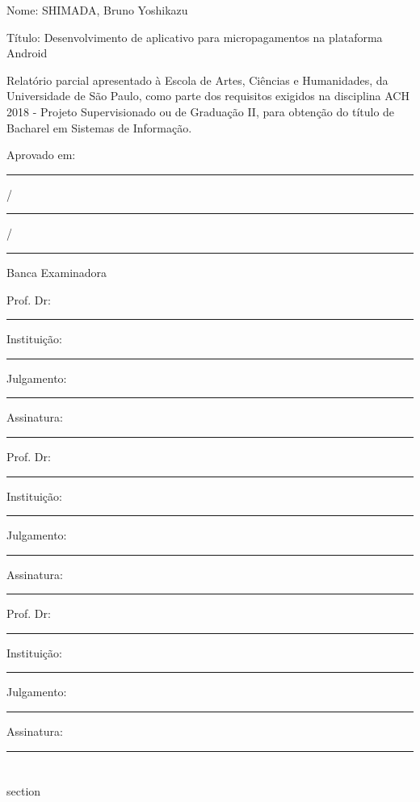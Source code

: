 \documentclass[hidelinks,12pt]{article}
\begin{document}
\begin{titlepage}
	\begin{flushleft}
		{\Large Nome: SHIMADA, Bruno Yoshikazu \par}
		{\Large T\'itulo: Desenvolvimento de aplicativo para micropagamentos na plataforma Android \par}
	\end{flushleft}
	\begin{flushright}
		Relat\'orio parcial apresentado \`a Escola de Artes, Ci\^encias e Humanidades, da Universidade de S\~ao Paulo, como parte dos requisitos exigidos na disciplina ACH 2018 - Projeto Supervisionado ou de Gradua\c{c}\~ao II, para obten\c{c}\~ao do t\'itulo de Bacharel em Sistemas de Informa\c{c}\~ao.
	\end{flushright}
	\vspace{1cm}
	\begin{flushleft}
		{\Large Aprovado em: \rule{1cm}{1pt}/\rule{1cm}{1pt}/\rule{2cm}{1pt} \par}
	\end{flushleft}
	\vfill
	\centering
		{\Large Banca Examinadora \par}
		\vspace{1cm}
		\begin{flushleft}
			{\Large Prof. Dr:\rule{5cm}{1pt}    Institui\c{c}\~ao:\rule{5cm}{1pt}\par}
			{\Large Julgamento:\rule{4,2cm}{1pt} Assinatura:\rule{5cm}{1pt}\par}
			\vspace{1cm}
			{\Large Prof. Dr:\rule{5cm}{1pt}    Institui\c{c}\~ao:\rule{5cm}{1pt}\par}
			{\Large Julgamento:\rule{4,2cm}{1pt} Assinatura:\rule{5cm}{1pt}\par}
			\vspace{1cm}
			{\Large Prof. Dr:\rule{5cm}{1pt}    Institui\c{c}\~ao:\rule{5cm}{1pt}\par}
			{\Large Julgamento:\rule{4,2cm}{1pt} Assinatura:\rule{5cm}{1pt}\par}
		\end{flushleft}
\end{titlepage}
\newpage
{}
\section*{}
section
\newpage
{}
\section*{}
\end{document}
